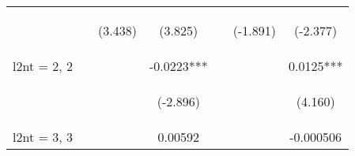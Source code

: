\documentclass[]{article}
\begin{document}
\begin{center}
\begin{tabular}{lcccccc}
        \vspace{4pt}     & \begin{footnotesize}\end{footnotesize}         & \begin{footnotesize}(3.438)\end{footnotesize}  & \begin{footnotesize}(3.825)\end{footnotesize}  & \begin{footnotesize}\end{footnotesize}         & \begin{footnotesize}(-1.891)\end{footnotesize} & \begin{footnotesize}(-2.377)\end{footnotesize} \\
        l2nt = 2, 2      &                                                &                                                & -0.0223***                                     &                                                &                                                & 0.0125***                                      \\
        \vspace{4pt}     & \begin{footnotesize}\end{footnotesize}         & \begin{footnotesize}\end{footnotesize}         & \begin{footnotesize}(-2.896)\end{footnotesize} & \begin{footnotesize}\end{footnotesize}         & \begin{footnotesize}\end{footnotesize}         & \begin{footnotesize}(4.160)\end{footnotesize}  \\
        l2nt = 3, 3      &                                                &                                                & 0.00592                                        &                                                &                                                & -0.000506                                      \\

\end{tabular}
\end{center}
\end{document}
